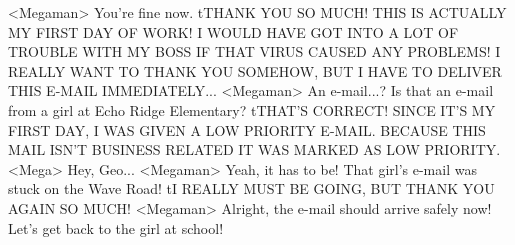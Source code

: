 <Megaman> You're fine now. 
tTHANK YOU SO MUCH! 
THIS IS ACTUALLY MY FIRST DAY OF WORK! 
I WOULD HAVE GOT INTO A LOT OF TROUBLE WITH 
MY BOSS IF THAT VIRUS CAUSED ANY PROBLEMS! 
I REALLY WANT TO THANK YOU SOMEHOW, BUT I 
HAVE TO DELIVER THIS E-MAIL IMMEDIATELY... 
<Megaman> An e-mail...? Is that an e-mail from a girl at Echo Ridge Elementary? 
tTHAT'S CORRECT! 
SINCE IT'S MY FIRST DAY, I WAS GIVEN A LOW PRIORITY E-MAIL. 
BECAUSE THIS MAIL ISN'T BUSINESS RELATED IT WAS MARKED AS LOW PRIORITY. 
<Mega> Hey, Geo... 
<Megaman> Yeah, it has to be! That girl's e-mail was stuck on the Wave Road! 
tI REALLY MUST BE GOING, BUT THANK YOU AGAIN SO MUCH! 
<Megaman> Alright, the e-mail should arrive safely now! 
Let's get back to the girl at school! 
